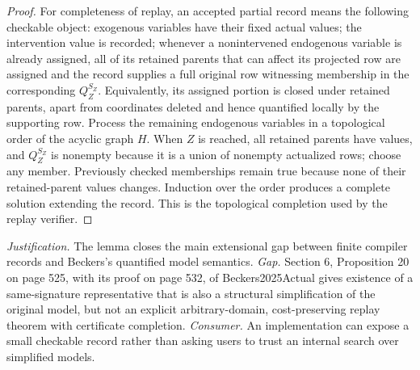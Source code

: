 \documentclass{article}
\begin{document}
\begin{proof}
For completeness of replay, an accepted partial record means the following checkable object: exogenous variables have their fixed actual values; the intervention value is recorded; whenever a nonintervened endogenous variable is already assigned, all of its retained parents that can affect its projected row are assigned and the record supplies a full original row witnessing membership in the corresponding \(Q_Z^{S_Z}\).  Equivalently, its assigned portion is closed under retained parents, apart from coordinates deleted and hence quantified locally by the supporting row.  Process the remaining endogenous variables in a topological order of the acyclic graph \(H\).  When \(Z\) is reached, all retained parents have values, and \(Q_Z^{S_Z}\) is nonempty because it is a union of nonempty actualized rows; choose any member.  Previously checked memberships remain true because none of their retained-parent values changes.  Induction over the order produces a complete solution extending the record.  This is the topological completion used by the replay verifier.
\end{proof}
\par\smallskip\noindent \textit{Justification.} The lemma closes the main extensional gap between finite compiler records and Beckers's quantified model semantics. \textit{Gap.} Section 6, Proposition 20 on page 525, with its proof on page 532, of Beckers2025Actual gives existence of a same-signature representative that is also a structural simplification of the original model, but not an explicit arbitrary-domain, cost-preserving replay theorem with certificate completion. \textit{Consumer.} An implementation can expose a small checkable record rather than asking users to trust an internal search over simplified models.
\end{document}
